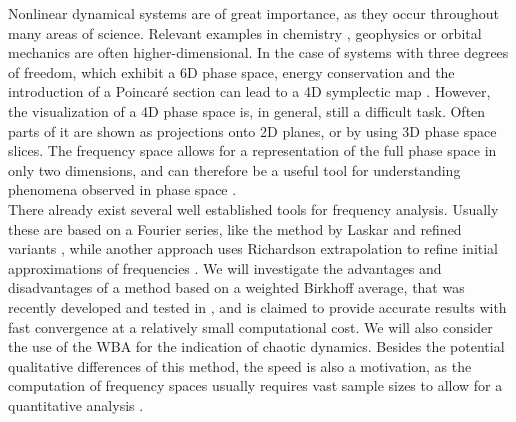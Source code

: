 Nonlinear dynamical systems are of great importance, as they occur throughout many areas of science. %
Relevant examples in chemistry \cite{Tod2005}, geophysics \cite{Sel2012} or orbital mechanics \cite{Las1990} are often higher-dimensional. 
In the case of systems with three degrees of freedom, which exhibit a 6D phase space, energy conservation and the introduction of a Poincaré section can lead to a 4D symplectic map \cite{Lan2017}.
However, the visualization of a 4D phase space is, in general, still a difficult task.
Often parts of it are shown as projections onto 2D planes, or by using 3D phase space slices.
The frequency space allows for a representation of the full phase space in only two dimensions, and can therefore be a useful tool for understanding phenomena observed in phase space \cite{Lan2012,RicLanBaeKet2014,FirLanKetBae2018}.
\\
There already exist several well established tools for frequency analysis.
Usually these are based on a Fourier series, like the method by Laskar \cite{Las1993} and refined variants \cite{BarBazGioScaTod1996,Hun2002}, while another approach uses Richardson extrapolation to refine initial approximations of frequencies \cite{LuqVil2014}.
We will investigate the advantages and disadvantages of a method based on a weighted Birkhoff average, that was recently developed and tested in \cite{DasSaiSanYor2016,DasSaiSanYor2017,DasYor2018,SanMei2020},
and is claimed to provide accurate results with fast convergence at a relatively small computational cost.
We will also consider the use of the WBA for the indication of chaotic dynamics.
Besides the potential qualitative differences of this method, the speed is also a motivation, as the computation of frequency spaces usually requires vast sample sizes to allow for a quantitative analysis \cite{RicLanBaeKet2014,FirLanKetBae2018}.
